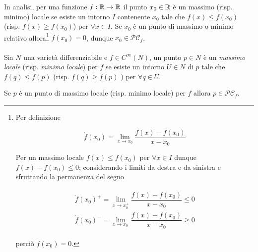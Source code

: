 In analisi, per una funzione $ f : \mathbb{R} \to \mathbb{R} $ il punto $ x_{0} \in \mathbb{R} $ è un massimo (risp. minimo) locale se esiste un intorno $ I $ contenente $ x_{0} $ tale che $ f(x) \leqslant f(x_{0}) $ (risp. $ f(x) \geqslant f(x_{0}) $) per $ \forall x \in I $. Se $ x_{0} $ è un punto di massimo o minimo relativo allora\footnote{%
	Per definizione
	
	\begin{equation}
		\dot{f}(x_{0}) = \lim_{x \to x_{0}} \dfrac{f(x) - f(x_{0})}{x - x_{0}}
	\end{equation}

	Per un massimo locale $ f(x) \leqslant f(x_{0}) $ per $ \forall x \in I $ dunque $ f(x) - f(x_{0}) \leqslant 0 $; considerando i limiti da destra e da sinistra e sfruttando la permanenza del segno
	
	\begin{align}
		\begin{split}
			\dot{f}(x_{0})^{+} = \lim_{x \to x_{0}^{+}} \dfrac{f(x) - f(x_{0})}{x - x_{0}} \leqslant 0\\
			\dot{f}(x_{0})^{-} = \lim_{x \to x_{0}^{-}} \dfrac{f(x) - f(x_{0})}{x - x_{0}} \geqslant 0
		\end{split}
	\end{align}

	perciò $ \dot{f}(x_{0}) = 0 $.%
} $ \dot{f}(x_{0}) = 0 $, dunque $ x_{0} \in \mathcal{PC}_{f} $.\\\\
%
Sia $ N $ una varietà differenziabile e $ f \in C^{\infty}(N) $, un punto $ p \in N $ è un \textit{massimo locale} (risp. \textit{minimo locale}) per $ f $ se esiste un intorno $ U \in N $ di $ p $ tale che $ f(q) \leqslant f(p) $ (risp. $ f(q) \geqslant f(p) $ ) per $ \forall q \in U $.

\begin{definition}
	Se $ p $ è un punto di massimo locale (risp. minimo locale) per $ f $ allora $ p \in \mathcal{PC}_{f} $.
\end{definition}

